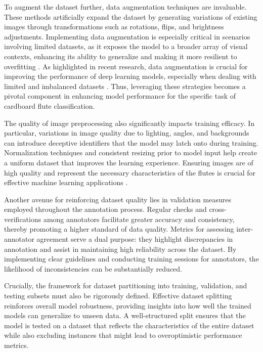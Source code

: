To augment the dataset further, data augmentation techniques are invaluable. These methods artificially expand the dataset by generating variations of existing images through transformations such as rotations, flips, and brightness adjustments. Implementing data augmentation is especially critical in scenarios involving limited datasets, as it exposes the model to a broader array of visual contexts, enhancing its ability to generalize and making it more resilient to overfitting \cite{chen2020augmentation}. As highlighted in recent research, data augmentation is crucial for improving the performance of deep learning models, especially when dealing with limited and imbalanced datasets \cite{Kumar2022}. Thus, leveraging these strategies becomes a pivotal component in enhancing model performance for the specific task of cardboard flute classification.


The quality of image preprocessing also significantly impacts training efficacy. In particular, variations in image quality due to lighting, angles, and backgrounds can introduce deceptive identifiers that the model may latch onto during training. Normalization techniques and consistent resizing prior to model input help create a uniform dataset that improves the learning experience. Ensuring images are of high quality and represent the necessary characteristics of the flutes is crucial for effective machine learning applications \cite{garcia2019preprocessing}.


Another avenue for reinforcing dataset quality lies in validation measures employed throughout the annotation process. Regular checks and cross-verifications among annotators facilitate greater accuracy and consistency, thereby promoting a higher standard of data quality. Metrics for assessing inter-annotator agreement serve a dual purpose: they highlight discrepancies in annotation and assist in maintaining high reliability across the dataset. By implementing clear guidelines and conducting training sessions for annotators, the likelihood of inconsistencies can be substantially reduced.


Crucially, the framework for dataset partitioning into training, validation, and testing subsets must also be rigorously defined. Effective dataset splitting reinforces overall model robustness, providing insights into how well the trained models can generalize to unseen data. A well-structured split ensures that the model is tested on a dataset that reflects the characteristics of the entire dataset while also excluding instances that might lead to overoptimistic performance metrics.




